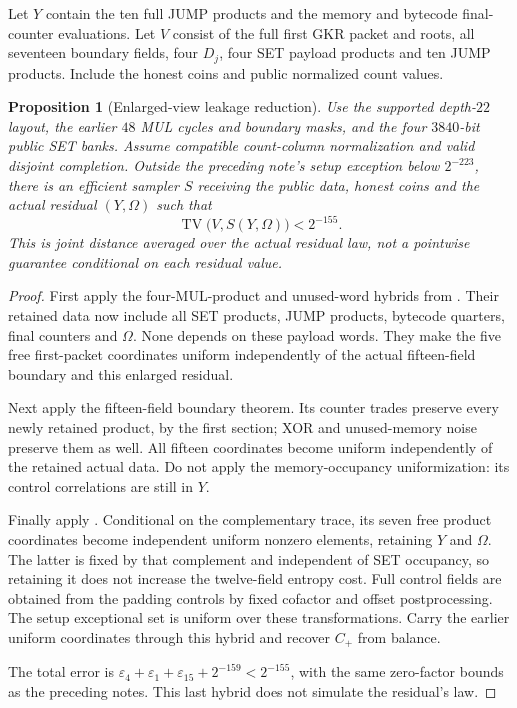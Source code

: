 \documentclass[11pt]{article}
\newtheorem{proposition}{Proposition}
\begin{document}
Let $Y$ contain the ten full JUMP products and the memory and bytecode final-counter evaluations. Let $V$ consist of the full first GKR packet and roots, all seventeen boundary fields, four $D_j$, four SET payload products and ten JUMP products. Include the honest coins and public normalized count values.

\begin{proposition}[Enlarged-view leakage reduction]
Use the supported depth-$22$ layout, the earlier $48$ MUL cycles and boundary masks, and the four $3840$-bit public SET banks. Assume compatible count-column normalization and valid disjoint completion. Outside the preceding note's setup exception below $2^{-223}$, there is an efficient sampler $S$ receiving the public data, honest coins and the \emph{actual} residual $(Y,\Omega)$ such that
\[
 \operatorname{TV}\bigl(V,S(Y,\Omega)\bigr)<2^{-155}.
\]
This is joint distance averaged over the actual residual law, not a pointwise guarantee conditional on each residual value.
\end{proposition}
\begin{proof}
First apply the four-MUL-product and unused-word hybrids from . Their retained data now include all SET products, JUMP products, bytecode quarters, final counters and $\Omega$. None depends on these payload words. They make the five free first-packet coordinates uniform independently of the actual fifteen-field boundary and this enlarged residual.

Next apply the fifteen-field boundary theorem. Its counter trades preserve every newly retained product, by the first section; XOR and unused-memory noise preserve them as well. All fifteen coordinates become uniform independently of the retained actual data. Do not apply the memory-occupancy uniformization: its control correlations are still in $Y$.

Finally apply . Conditional on the complementary trace, its seven free product coordinates become independent uniform nonzero elements, retaining $Y$ and $\Omega$. The latter is fixed by that complement and independent of SET occupancy, so retaining it does not increase the twelve-field entropy cost. Full control fields are obtained from the padding controls by fixed cofactor and offset postprocessing. The setup exceptional set is uniform over these transformations. Carry the earlier uniform coordinates through this hybrid and recover $C_+$ from balance.

The total error is $\varepsilon_4+\varepsilon_1+\varepsilon_{15}+2^{-159}<2^{-155}$, with the same zero-factor bounds as the preceding notes. This last hybrid does not simulate the residual's law.
\end{proof}
\end{document}
